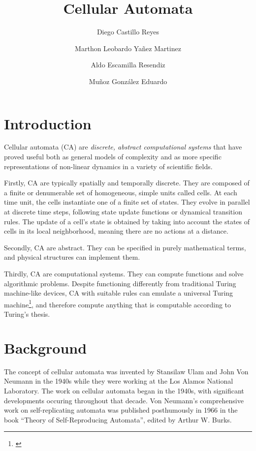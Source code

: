 \documentclass[9pt,a4paper,twoside]{tau-class/tau}
\title{Cellular Automata}
\author[a]{Diego Castillo Reyes}
\author[a]{Marthon Leobardo Yañez Martinez}
\author[a]{Aldo Escamilla Resendiz}
\author[a]{Muñoz González Eduardo}
\affil[a]{Researcher}
\begin{document}
	
    \maketitle 
    \thispagestyle{firststyle} \tauabstract
    \tableofcontents

\section{Introduction}

    Cellular automata (CA) are \textit{discrete, abstract computational systems} that have proved useful both as general models of complexity and as more specific representations of non-linear dynamics in a variety of scientific fields. 

    Firstly, CA are typically spatially and temporally discrete. They are composed of a finite or denumerable set of homogeneous, simple units called cells. At each time unit, the cells instantiate one of a finite set of states. 
    They evolve in parallel at discrete time steps, following state update functions or dynamical transition rules. 
    The update of a cell's state is obtained by taking into account the states of cells in its local neighborhood, meaning there are no actions at a distance.

    Secondly, CA are abstract. They can be specified in purely mathematical terms, and physical structures can implement them.

    Thirdly, CA are computational systems. They can compute functions and solve algorithmic problems. Despite functioning differently from traditional 
    Turing machine-like devices, CA with suitable rules can emulate a universal Turing machine\footnote{\cite[The Stanford Encyclopedia of Philosophy (Winter 2021 Edition), Edward N. Zalta (ed.)]{sep-touring-machine}}, 
    and therefore compute anything that is computable according to Turing's thesis.\cite{sep-cellular-automata}


\section{Background}


    The concept of cellular automata was invented by Stansilaw Ulam and John Von Neumann in
    the 1940s while they were working at the Los Alamos National Laboratory.
    The work on cellular automata began in the 1940s, with significant developments occuring throughout
    that decade. Von Neumann’s comprehensive work on self-replicating automata was published 
    posthumously in 1966 in the book ``Theory of Self-Reproducing Automata'', edited by 
    Arthur W. Burks.
\end{document}
